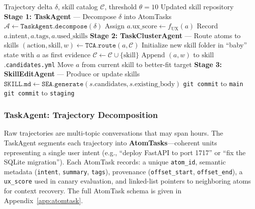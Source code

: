 \documentclass{article}
\begin{document}
\begin{algorithm}[t]
\caption{Three-Agent Skill Distillation Pipeline}
\label{alg:pipeline}
\begin{algorithmic}[1]
\REQUIRE Trajectory delta $\delta$, skill catalog $\mathcal{C}$, threshold $\theta = 10$
\ENSURE Updated skill repository
\STATE \textbf{Stage 1: TaskAgent} --- Decompose $\delta$ into AtomTasks
\STATE $\mathcal{A} \leftarrow \texttt{TaskAgent.decompose}(\delta)$ 
    \STATE Assign $a.\mathrm{ux\_score} \leftarrow f_{\mathrm{UX}}(a)$ 
    \STATE Record $a.\mathrm{intent}, a.\mathrm{tags}, a.\mathrm{used\_skills}$
\ENDFOR
\STATE
\STATE \textbf{Stage 2: TaskClusterAgent} --- Route atoms to skills
    \STATE $(\mathrm{action}, \mathrm{skill}, w) \leftarrow \texttt{TCA.route}(a, \mathcal{C})$
        \STATE Initialize new skill folder in ``baby'' state with $a$ as first evidence
        \STATE $\mathcal{C} \leftarrow \mathcal{C} \cup \{\mathrm{skill}\}$
        \STATE Append $(a, w)$ to $\mathrm{skill}$.\texttt{candidates.yml}
        \STATE Move $a$ from current skill to better-fit target
    \ENDIF
\ENDFOR
\STATE
\STATE \textbf{Stage 3: SkillEditAgent} --- Produce or update skills
        \STATE $\texttt{SKILL.md} \leftarrow \texttt{SEA.generate}(s.\mathrm{candidates}, s.\mathrm{existing\_body})$
            \STATE \texttt{git commit} to \texttt{main} 
        \ELSE
            \STATE \texttt{git commit} to \texttt{staging} 
        \ENDIF
    \ENDIF
\ENDFOR
\end{algorithmic}
\end{algorithm}

\subsubsection{TaskAgent: Trajectory Decomposition}

Raw trajectories are multi-topic conversations that may span hours. The TaskAgent segments each trajectory into \textbf{AtomTasks}---coherent units representing a single user intent (e.g., ``deploy FastAPI to port 1717'' or ``fix the SQLite migration''). Each AtomTask records: a unique \texttt{atom\_id}, semantic metadata (\texttt{intent}, \texttt{summary}, \texttt{tags}), provenance (\texttt{offset\_start}, \texttt{offset\_end}), a \texttt{ux\_score} used in canary evaluation, and linked-list pointers to neighboring atoms for context recovery. The full AtomTask schema is given in Appendix~\ref{app:atomtask}.
\end{document}
